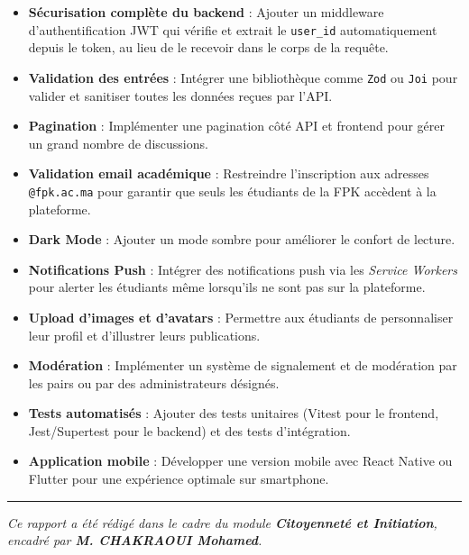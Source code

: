 \documentclass[12pt, a4paper]{report}
\begin{document}
\begin{itemize}
    \item \textbf{Sécurisation complète du backend} : Ajouter un middleware d'authentification JWT qui vérifie et extrait le \texttt{user\_id} automatiquement depuis le token, au lieu de le recevoir dans le corps de la requête.
    \item \textbf{Validation des entrées} : Intégrer une bibliothèque comme \texttt{Zod} ou \texttt{Joi} pour valider et sanitiser toutes les données reçues par l'API.
    \item \textbf{Pagination} : Implémenter une pagination côté API et frontend pour gérer un grand nombre de discussions.
    \item \textbf{Validation email académique} : Restreindre l'inscription aux adresses \texttt{@fpk.ac.ma} pour garantir que seuls les étudiants de la FPK accèdent à la plateforme.
    \item \textbf{Dark Mode} : Ajouter un mode sombre pour améliorer le confort de lecture.
    \item \textbf{Notifications Push} : Intégrer des notifications push via les \textit{Service Workers} pour alerter les étudiants même lorsqu'ils ne sont pas sur la plateforme.
    \item \textbf{Upload d'images et d'avatars} : Permettre aux étudiants de personnaliser leur profil et d'illustrer leurs publications.
    \item \textbf{Modération} : Implémenter un système de signalement et de modération par les pairs ou par des administrateurs désignés.
    \item \textbf{Tests automatisés} : Ajouter des tests unitaires (Vitest pour le frontend, Jest/Supertest pour le backend) et des tests d'intégration.
    \item \textbf{Application mobile} : Développer une version mobile avec React Native ou Flutter pour une expérience optimale sur smartphone.
\end{itemize}

\vspace{1cm}
\noindent\rule{\textwidth}{0.5pt}
\begin{center}
    \textit{Ce rapport a été rédigé dans le cadre du module \textbf{Citoyenneté et Initiation}, encadré par \textbf{M. CHAKRAOUI Mohamed}.}
\end{center}
\end{document}

